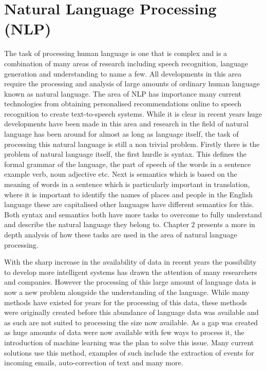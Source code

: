 \section{Natural Language Processing (NLP)}
The task of processing human language is one that is complex and is a combination of many areas of research including speech recognition, language generation and understanding to name a few. All developments in this area require the processing and analysis of large amounts of ordinary human language known as natural language. The area of NLP has importance many current technologies from obtaining personalised recommendations online to speech recognition to create text-to-speech systems. While it is clear in recent years huge developments have been made in this area and research in the field of natural language has been around for almost as long as language itself, the task of processing this natural language is still a non trivial problem. Firstly there is the problem of natural language itself, the first hurdle is syntax. This defines the formal grammar of the language, the part of speech of the words in a sentence example verb, noun adjective etc. Next is semantics which is based on the meaning of words in a sentence which is particularly important in translation, where it is important to identify the names of places and people in the English language these are capitalised other languages have different semantics for this. Both syntax and semantics both have more tasks to overcome to fully understand and describe the natural language they belong to. Chapter 2 presents a more in depth analysis of how these tasks are used in the area of natural language processing. 

With the sharp increase in the availability of data in recent years the possibility to develop more intelligent systems has drawn the attention of many researchers and companies. However the processing of this large amount of language data is now a new problem alongside the understanding of the language. While many methods have existed for years for the processing of this data, these methods were originally created before this abundance of language data was available and as such are not suited to processing the size now available. As a gap was created as huge amounts of data were now available with few ways to process it, the introduction of machine learning was the plan to solve this issue. Many current solutions use this method, examples of such include the extraction of events for incoming emails, auto-correction of text and many more.

